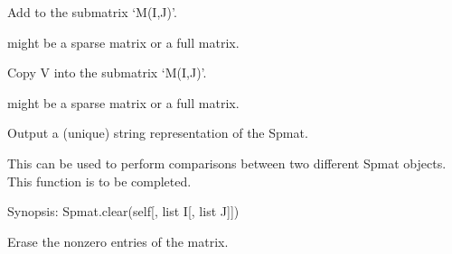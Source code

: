 \documentclass[a4paper,11pt,english]{sphinxmanual}
\begin{document}
\begin{fulllineitems}
\begin{itemize}
\end{itemize}

\begin{fulllineitems}
\label{\detokenize{python/cmdref_Spmat:getfem.Spmat.add}}
Add  to the sub\sphinxhyphen{}matrix ‘M(I,J)’.

 might be a sparse matrix or a full matrix.

\end{fulllineitems}


\begin{fulllineitems}
\label{\detokenize{python/cmdref_Spmat:getfem.Spmat.assign}}
Copy V into the sub\sphinxhyphen{}matrix ‘M(I,J)’.

 might be a sparse matrix or a full matrix.

\end{fulllineitems}


\begin{fulllineitems}
\label{\detokenize{python/cmdref_Spmat:getfem.Spmat.char}}
Output a (unique) string representation of the Spmat.

This can be used to perform comparisons between two
different Spmat objects.
This function is to be completed.

\end{fulllineitems}


\begin{fulllineitems}
\label{\detokenize{python/cmdref_Spmat:getfem.Spmat.clear}}
Synopsis: Spmat.clear(self{[}, list I{[}, list J{]}{]})

Erase the non\sphinxhyphen{}zero entries of the matrix.


\end{fulllineitems}
\end{fulllineitems}
\end{document}
